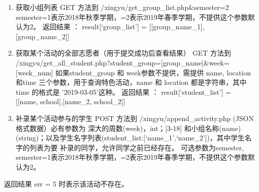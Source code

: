 \documentclass[]{article}
\begin{document}
\begin{enumerate}
\def\labelenumi{\arabic{enumi}.}
\setcounter{enumi}{4}
\item
  获取小组列表 GET 方法到 /xingyu/get\_group\_list.php\&semester=2
  semester=1表示2018年秋季学期，=2表示2019年春季学期，不提供这个参数默认为2。
  返回结果 ： result{[}`group\_list'{]} =
  {[}{[}group\_name\_1{]},{[}group\_name\_2{]}{]}
\item
  获取某个活动的全部志愿者（用于提交成功后查看结果） GET 方法到
  /xingyu/get\_all\_student.php?student\_group={[}group\_name{]}\&week={[}week\_num{]}
  如果student\_group 和 week参数不提供，需提供 name, location 和time
  三个参数，用于查询特色活动，name 和 location 都是字符串，其中 time
  的格式是 '2019-03-05'这种。 返回结果 ： result{[}`student\_list'{]} =
  {[}{[}name, school{]},{[}name\_2, school\_2{]}{]}
\item
  补录某个活动参与的学生 POST 方法到 /xingyu/append\_activity.php
  (JSON格式数据）必有参数为 深大的周数(week)，int；{[}3-18{]}
  和小组名称(name)(string)；以及学生名字列表(student\_list:{[}`name\_1',`name\_2'{]})，其中学生名字的列表为要
  补录的同学，允许同学之前已经存在。 可选参数为semester,
  semester=1表示2018年秋季学期，=2表示2019年春季学期，不提供这个参数默认为2。
\end{enumerate}

返回结果 err = 5 时表示该活动不存在。
\end{document}
